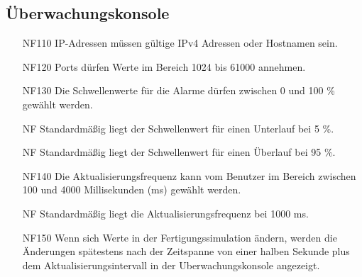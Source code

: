 \documentclass[parskip=full]{scrartcl}
\begin{document}
\subsection{Überwachungskonsole}
\begin{enumerate}
  \item[NF110] IP-Adressen müssen gültige IPv4 Adressen oder Hostnamen sein. %
  \item[NF120] Ports dürfen Werte im Bereich 1024 bis 61000 annehmen.
  \item[NF130] Die Schwellenwerte für die Alarme dürfen zwischen 0 und 100 \% gewählt werden.
  \item[NF] Standardmäßig liegt der Schwellenwert für einen Unterlauf bei 5 \%.
  \item[NF] Standardmäßig liegt der Schwellenwert für einen Überlauf bei 95 \%.
  \item[NF140] Die Aktualisierungsfrequenz kann vom Benutzer im Bereich zwischen 100 und 4000 Millisekunden (ms) gewählt werden.
  \item[NF] Standardmäßig liegt die Aktualisierungsfrequenz bei 1000 ms.
  \item[NF150] Wenn sich Werte in der \gls{Fertigungssimulation} ändern, werden die Änderungen spätestens nach der Zeitspanne von
    einer halben Sekunde plus dem Aktualisierungsintervall in der \gls{Uberwachungskonsole} angezeigt.
\end{enumerate}

\pagebreak
\end{document}
